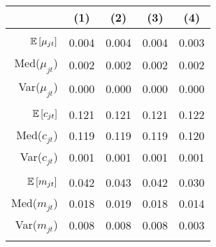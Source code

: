 \begin{tabular}{r|cccc}
 & (1) & (2) & (3) & (4) \\\hline &&&& \\ 
$\mathbb{E}\left[\mu_{jt}\right]$ & 0.004 & 0.004  & 0.004  & 0.003 \\ 
Med($\mu_{jt}$)& 0.002 & 0.002 & 0.002 & 0.002 \\
 Var($\mu_{jt}$)& 0.000 & 0.000 & 0.000 & 0.000 \\
 &&&&\\ 
$\mathbb{E}\left[c_{jt}\right]$ & 0.121 & 0.121  & 0.121  & 0.122 \\ 
Med($c_{jt}$)& 0.119 & 0.119 & 0.119 & 0.120 \\
 Var($c_{jt}$)& 0.001 & 0.001 & 0.001 & 0.001 \\
 &&&&\\ 
$\mathbb{E}\left[m_{jt}\right]$ & 0.042 & 0.043  & 0.042  & 0.030 \\ 
Med($m_{jt}$) & 0.018 & 0.019 & 0.018 & 0.014 \\
Var($m_{jt}$) & 0.008 & 0.008 & 0.008 & 0.003 \\
&&&&\\\hline 
\end{tabular}